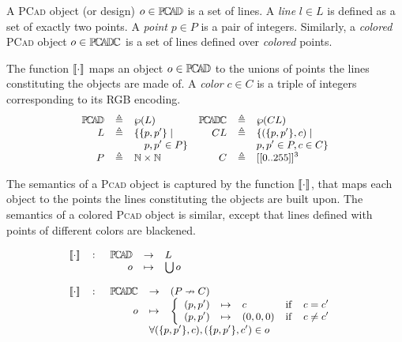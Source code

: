 \begin{Definition}
   A \textsc{PCad} object (or design) $o\in \mathbb{P}\!\mathbb{C}\!\mathbb{A}\!\mathbb{D} $ is a set of lines. A 
\emph{line} $l \in L$ is defined as a set of exactly two points. A \emph{point} 
$p\in P$ is a pair of integers. Similarly, a \emph{colored} \textsc{PCad} object 
$o\in \mathbb{P}\!\mathbb{C}\!\mathbb{A}\!\mathbb{D} \!\mathbb{C} $ is a set of lines defined over \emph{colored} points.


The function $\llbracket \cdot \rrbracket$ maps an object $o\in \mathbb{P}\!\mathbb{C}\!\mathbb{A}\!\mathbb{D} $ to the 
unions of points the lines constituting the objects are made of. A \emph{color} 
$c\in C$ is a triple of integers corresponding to its RGB encoding.
\begin{displaymath}
   \begin{small}
     \begin{array}{rcl rcl}
      \PCAD &\eqdef& \wp(L) & \PCADC &\eqdef& \wp(CL)\\
      L     &\eqdef& \{ \{p, p'\} \;|\; & CL &\eqdef& \{ (\{p, 
p'\}, c) \;|\;  \\
            &      & \quad p, p' \in P \} & & & p, p' \in P, c\in C\}\\
      P     &\eqdef& \mathbb{N} \times \mathbb{N} & C     &\eqdef& 
[[0..255]]^3
   \end{array}
   \end{small}
\end{displaymath}

The semantics of a \textsc{Pcad} object is captured by the function 
$\llbracket \cdot \rrbracket$, that maps each object to the points the lines constituting the 
objects are built upon. The semantics of a colored \textsc{Pcad} object is 
similar, except that lines defined with points of different colors are 
blackened.

\begin{displaymath}
   \begin{small}
     \begin{array}{rcl}
\SMapping & \colon & \!\!\!\begin{array}[t]{rcl}
         \PCAD &\to& L\\
         o &\mapsto& \bigcup o
      \end{array}\\\\
\SMapping & \colon & \!\!\!\begin{array}[t]{rcl}
         \PCADC &\to& (P \nrightarrow C)\\
         o &\mapsto& \left\{ \begin{array}{rclcl}
            (p, p') &\mapsto& c & \mathrm{if} & c = c'\\
            (p, p') &\mapsto& (0,0,0) & \mathrm{if} & c \neq c'\\ 
         \end{array}\right. \\
         & \multicolumn{2}{l}{\forall (\{p, p'\}, c), (\{p, p'\}, c') \in o}\\
      \end{array}
   \end{array}
   \end{small}
\end{displaymath}
\end{Definition}

